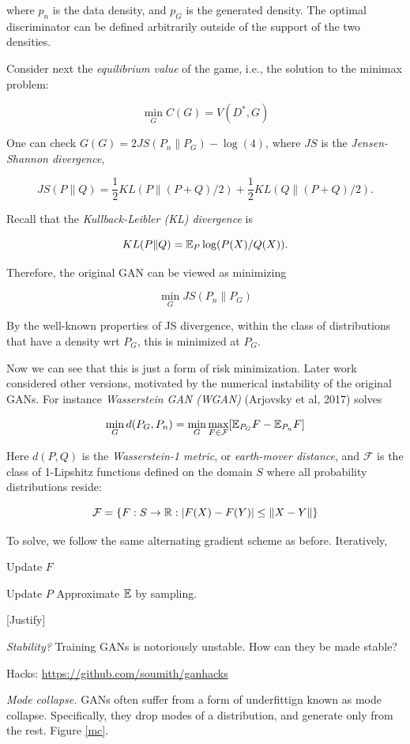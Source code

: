 \documentclass[english]{article}
\begin{document}
where $p_n$ is the data density, and $p_G$ is the generated density. The optimal discriminator can be defined arbitrarily outside of the support of the two densities. 

Consider next the \emph{equilibrium value} of the game, i.e., the solution to the minimax problem: 

$$\min_G C(G)  = V(D^*,G) $$
 
One can check $G(G) = 2 JS(P_n \| P_G) - \log(4)$, where $JS$ is the \emph{Jensen-Shannon divergence}, 

$$JS(P\| Q) = \frac12 KL(P\|(P+Q)/2)+ \frac12 KL(Q\|(P+Q)/2).$$ 

Recall that the \emph{Kullback-Leibler (KL) divergence} is 

$$KL(P\|Q) = \mathbb{E}_P \log(P(X)/Q(X)).$$


Therefore, the original GAN can be viewed as minimizing 

$$\min_G JS(P_n \| P_G) $$
 
By the well-known properties of JS divergence, within the class of distributions that have a density wrt $P_G$, this is minimized at $P_G$. 


\item Now we can see that this is just a form of risk minimization. Later work considered other versions, motivated by the numerical instability of the original GANs. For instance \emph{Wasserstein GAN (WGAN)} (Arjovsky et al, 2017) solves

$$ \min_{G} d(P_G ,P_n) =  \min_{G} \max_{F\in \mathcal{F}}[ \mathbb{E}_{P_G} F - \mathbb{E}_{P_n} F]$$

Here $d(P,Q)$ is the \emph{Wasserstein-1 metric}, or \emph{earth-mover distance}, and $ \mathcal{F}$ is the class of 1-Lipshitz functions defined on the domain $S$ where all probability distributions reside: 

$$\mathcal{F} = \{F: S \to \mathbb{R}: |F(X)- F(Y)| \le \|X-Y\|\}$$

To solve, we follow the same alternating gradient scheme as before. Iteratively, 
\benum
\item Update $F$
\item Update $P$
\eenum
Approximate $\mathbb{E}$ by sampling.

[Justify]

\item \emph{Stability?} Training GANs is notoriously unstable. How can they be made stable?

Hacks: \url{https://github.com/soumith/ganhacks}


\item \emph{Mode collapse.} GANs often suffer from a form of underfittign known as mode collapse. Specifically, they drop modes of a distribution, and generate only from the rest. Figure \ref{mc}. %
\end{document}
